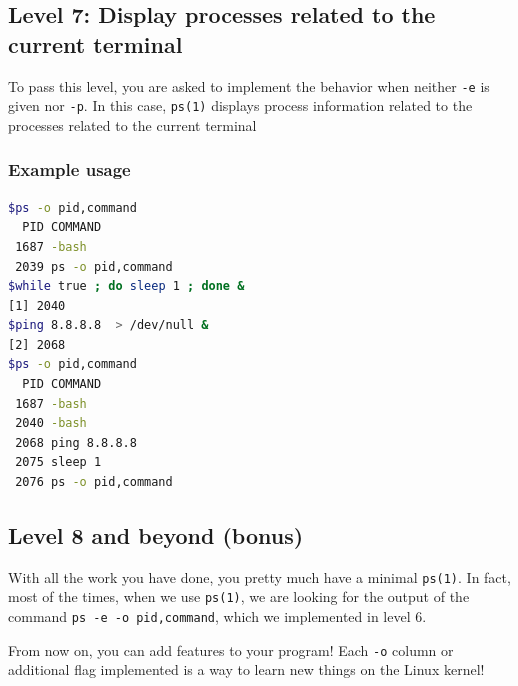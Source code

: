 \documentclass[12pt]{article}
\begin{document}
\subsection{Level 7: Display processes related to the current terminal}

To pass this level, you are asked to implement the behavior when neither \texttt{-e} is given nor \texttt{-p}. In this case, \texttt{ps(1)} displays process information related to the processes related to the current terminal

\subsubsection{Example usage}

\begin{lstlisting}[language=bash]
$ps -o pid,command
  PID COMMAND
 1687 -bash
 2039 ps -o pid,command
$while true ; do sleep 1 ; done &
[1] 2040
$ping 8.8.8.8  > /dev/null &
[2] 2068
$ps -o pid,command
  PID COMMAND
 1687 -bash
 2040 -bash
 2068 ping 8.8.8.8
 2075 sleep 1
 2076 ps -o pid,command
\end{lstlisting}

\subsection{Level 8 and beyond (bonus)}

With all the work you have done, you pretty much have a minimal \texttt{ps(1)}. In fact, most of the times, when we use \texttt{ps(1)}, we are looking for the output of the command \texttt{ps -e -o pid,command}, which we implemented in level 6.

From now on, you can add features to your program! Each \texttt{-o} column or additional flag implemented is a way to learn new things on the Linux kernel!
\end{document}

